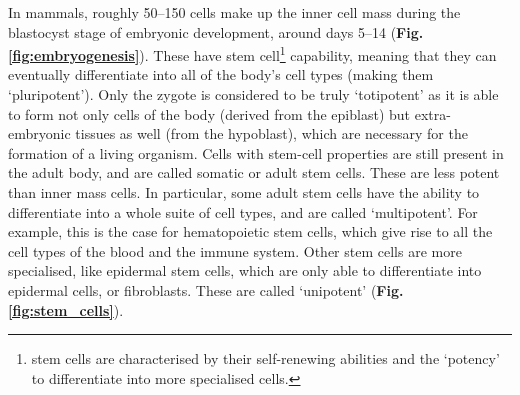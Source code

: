 In mammals, roughly 50–150 cells make up the inner cell mass during the blastocyst stage of embryonic development, around days 5–14 (\textbf{Fig. \ref{fig:embryogenesis}}). 
These have stem cell\footnote{stem cells are characterised by their self-renewing abilities and the `potency' to differentiate into more specialised cells.} capability, meaning that they can eventually differentiate into all of the body's cell types (making them `pluripotent').
Only the zygote is considered to be truly `totipotent' as it is able to form not only cells of the body (derived from the epiblast) but extra-embryonic tissues as well (from the hypoblast), which are necessary for the formation of a living organism.
Cells with stem-cell properties are still present in the adult body, and are called somatic or adult stem cells.
These are less 
potent
than inner mass cells.
In particular, some adult stem cells have the ability to differentiate into a whole suite of cell types, and are called `multipotent'.
For example, this is the case for hematopoietic stem cells, which give rise to all the cell types of the blood and the immune system.
Other stem cells are more specialised, like epidermal stem cells, which are only able to differentiate into epidermal cells, or fibroblasts.
These are called `unipotent' (\textbf{Fig. \ref{fig:stem_cells}}).\\

